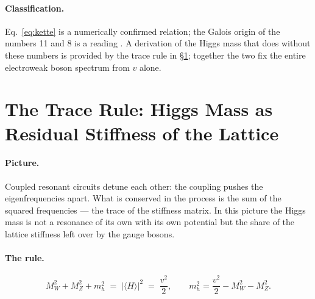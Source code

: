 \paragraph{Classification.}
Eq.~\eqref{eq:kette} is a numerically confirmed relation; the Galois origin
of the numbers 11 and 8 is a reading \SM. A derivation of the Higgs mass
that does without these numbers is provided by the trace rule in
§\ref{sec:spur}; together the two fix the entire electroweak boson spectrum
from $v$ alone.

\section{The Trace Rule: Higgs Mass as Residual Stiffness of the Lattice}
\label{sec:spur}

\paragraph{Picture.}
Coupled resonant circuits detune each other: the coupling pushes the
eigenfrequencies apart. What is conserved in the process is the sum of the
squared frequencies --- the trace of the stiffness matrix. In this picture
the Higgs mass is not a resonance of its own with its own potential but the
share of the lattice stiffness left over by the gauge bosons.

\paragraph{The rule.}
\begin{equation}
  M_W^2 + M_Z^2 + m_h^2 \;=\; |\langle H\rangle|^2 \;=\; \frac{v^2}{2},
  \qquad
  m_h^2 = \frac{v^2}{2} - M_W^2 - M_Z^2 .
  \label{eq:spur}
\end{equation}

